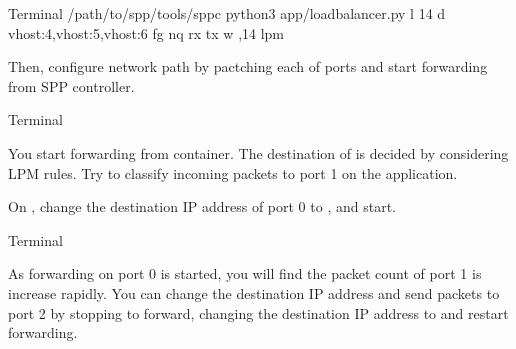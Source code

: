 \documentclass[a4paper,11pt,openany,oneside,english]{sphinxmanual}
\begin{document}
\begin{sphinxVerbatim}[commandchars=\\\{\},formatcom=\footnotesize]
 Terminal 
  /path/to/spp/tools/sppc
 python3 app/load\PYGZus{}balancer.py \PYGZhy{}l \PYGZhy{}14 
  \PYGZhy{}d vhost:4,vhost:5,vhost:6 
  \PYGZhy{}fg \PYGZhy{}nq  
  \PYGZhy{}rx  
  \PYGZhy{}tx  
  \PYGZhy{}w ,14 
  \PYGZhy{}\PYGZhy{}lpm 
\end{sphinxVerbatim}

Then, configure network path by pactching each of ports
and start forwarding from SPP controller.

\begin{sphinxVerbatim}[commandchars=\\\{\},formatcom=\footnotesize]
 Terminal 
\end{sphinxVerbatim}

You start forwarding from  container.
The destination of  is decided by considering
LPM rules. Try to classify incoming packets to port 1 on the
 application.

On , change the destination IP address of port 0
to , and start.

\begin{sphinxVerbatim}[commandchars=\\\{\},formatcom=\footnotesize]
 Terminal 
\end{sphinxVerbatim}

As forwarding on port 0 is started, you will find the packet count of
port 1 is increase rapidly.
You can change the destination IP address and send packets to port 2
by stopping to forward,
changing the destination IP address to  and restart
forwarding.
\end{document}
